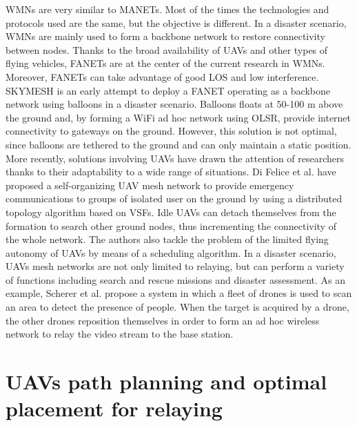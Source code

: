 \glspl{WMN} are very similar to \glspl{MANET}. Most of the times the technologies and protocols used are the same, but the objective is different. In a disaster scenario, \glspl{WMN} are mainly used to form a backbone network to restore connectivity between nodes. Thanks to the broad availability of \glspl{UAV} and other types of flying vehicles, \glspl{FANET} are at the center of the current research in \glspl{WMN}. Moreover, \glspl{FANET} can take advantage of good \gls{LOS} and low interference. SKYMESH \cite{ref:soa-fanet1} is an early attempt to deploy a \gls{FANET} operating as a backbone network using balloons in a disaster scenario. Balloons floats at 50-100 m above the ground and, by forming a WiFi ad hoc network using OLSR, provide internet connectivity to gateways on the ground. However, this solution is not optimal, since balloons are tethered to the ground and can only maintain a static position. More recently, solutions involving \glspl{UAV} have drawn the attention of researchers thanks to their adaptability to a wide range of situations. Di Felice et al. \cite{ref:soa-fanet2} have proposed a self-organizing \gls{UAV} mesh network to provide emergency communications to  groups of isolated user on the ground by using a distributed topology algorithm based on \glspl{VSF}. Idle \glspl{UAV} can detach themselves from the formation to search other ground nodes, thus incrementing the connectivity of the whole network. The authors also tackle the problem of the limited flying autonomy of \glspl{UAV} by means of a scheduling algorithm.   
In a disaster scenario, \glspl{UAV} mesh networks are not only limited to relaying, but can perform a variety of functions including search and rescue missions and disaster assessment. As an example, Scherer et al. \cite{ref:soa-fanet3} propose a system in which a fleet of drones is used to scan an area to detect the presence of people. When the target is acquired by a drone, the other drones reposition themselves in order to form an ad hoc wireless network to relay the video stream to the base station.

\section{UAVs path planning and optimal placement for relaying}

